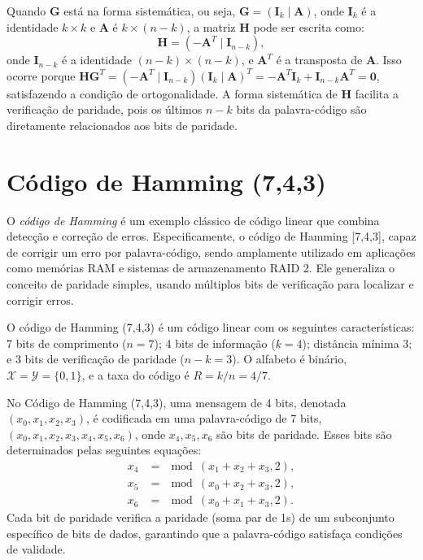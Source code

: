 \begin{definition}
Quando $\mathbf{G}$ está na forma sistemática, ou seja, $\mathbf{G} = (\mathbf{I}_k \mid \mathbf{A})$, 
onde $\mathbf{I}_k$ é a identidade $k \times k$ e $\mathbf{A}$ é $k \times (n-k)$, a matriz $\mathbf{H}$ pode ser escrita como:
\begin{equation}
\mathbf{H} = (-\mathbf{A}^T \mid \mathbf{I}_{n-k}),
\end{equation}
onde $\mathbf{I}_{n-k}$ é a identidade $(n-k) \times (n-k)$, 
e $\mathbf{A}^T$ é a transposta de $\mathbf{A}$. 
Isso ocorre porque $\mathbf{H} \mathbf{G}^T = (-\mathbf{A}^T \mid \mathbf{I}_{n-k}) (\mathbf{I}_k \mid \mathbf{A})^T = -\mathbf{A}^T \mathbf{I}_k + \mathbf{I}_{n-k} \mathbf{A}^T = \mathbf{0}$, 
satisfazendo a condição de ortogonalidade. A forma sistemática de $\mathbf{H}$ facilita 
a verificação de paridade, pois os últimos $n-k$ bits da palavra-código são diretamente relacionados aos bits de paridade.
\end{definition}






\section{Código de Hamming (7,4,3)}

O \emph{código de Hamming} \parencite{hamming1950} é um exemplo
clássico de código linear que combina detecção e correção de erros.
Especificamente, o código de Hamming [7,4,3], capaz de
corrigir um erro por palavra-código, sendo amplamente utilizado em aplicações
como memórias RAM e sistemas de armazenamento RAID 2. Ele generaliza o conceito
de paridade simples, usando múltiplos bits de verificação para localizar e corrigir erros.

\begin{definition}
O código de Hamming (7,4,3) é um código linear com os seguintes características:
7 bits de comprimento ($n=7$); 4 bits de informação ($k=4$); distância mínima 3; e
3 bits de verificação de paridade ($n-k=3$).
O alfabeto é binário, $\mathcal{X} = \mathcal{Y} = \{0, 1\}$, e a taxa do código é $R = k/n = 4/7$.
\end{definition}

No Código de Hamming (7,4,3), uma mensagem de 4 bits, denotada $(x_0, x_1, x_2, x_3)$, 
é codificada em uma palavra-código de 7 bits, $(x_0, x_1, x_2, x_3, x_4, x_5, x_6)$, 
onde $x_4, x_5, x_6$ são bits de paridade. 
Esses bits são determinados pelas seguintes equações:
\begin{subequations}
\begin{align}
x_4 &= \mod(x_1 + x_2 + x_3, 2), \label{eq:hamming_p1} \\
x_5 &= \mod(x_0 + x_2 + x_3, 2), \label{eq:hamming_p2} \\
x_6 &= \mod(x_0 + x_1 + x_3, 2). \label{eq:hamming_p3}
\end{align}
\end{subequations}
Cada bit de paridade verifica a paridade (soma par de 1s) de um subconjunto
específico de bits de dados, garantindo que a palavra-código satisfaça
condições de validade.

